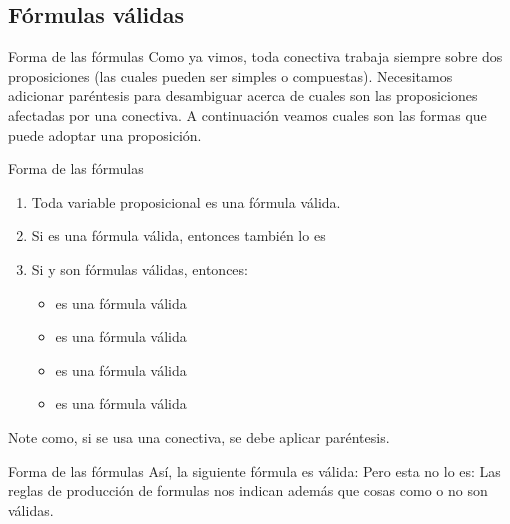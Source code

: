
\subsection{Fórmulas válidas}


\begin{frame}{Forma de las fórmulas}
  Como ya vimos, toda conectiva trabaja siempre sobre dos proposiciones (las
  cuales pueden ser simples o compuestas).
  \jump
  Necesitamos adicionar paréntesis para desambiguar acerca de cuales son las
  proposiciones afectadas por una conectiva.
  \jump
  A continuación veamos cuales son las formas que puede adoptar una proposición.
\end{frame}


\begin{frame}{Forma de las fórmulas}
  \begin{enumerate}
    \item Toda variable proposicional es una fórmula válida.
    \item Si  es una fórmula válida, entonces  también lo es
    \item Si  y  son fórmulas válidas, entonces:
      \begin{itemize}
        \item {} es una fórmula válida
        \item {} es una fórmula válida
        \item {} es una fórmula válida
        \item {} es una fórmula válida
      \end{itemize}
  \end{enumerate}
  \jump
  Note como, si se usa una conectiva, se debe aplicar paréntesis.
\end{frame}


\begin{frame}{Forma de las fórmulas}
  Así, la siguiente fórmula es válida:
  \jump
  \jump
  Pero esta no lo es:
  \jump
  \jump
  Las reglas de producción de formulas nos indican además que cosas como
   o  no son válidas.
\end{frame}

